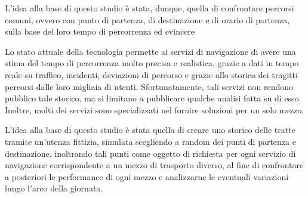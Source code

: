 L'idea alla base di questo studio è stata, dunque, quella di confrontare percorsi comuni, ovvero con punto di partenza, di destinazione e di orario di partenza, sulla base del loro tempo di percorrenza ed evincere 


















Lo stato attuale della tecnologia permette ai servizi di navigazione di avere una stima del tempo di percorrenza molto precisa e realistica, grazie a dati in tempo reale su traffico, incidenti, deviazioni di percorso e grazie allo storico dei tragitti percorsi dalle loro migliaia di utenti. Sfortunatamente, tali servizi non rendono pubblico tale storico, ma si limitano a pubblicare qualche analisi fatta su di esso. Inoltre, molti dei servizi sono specializzati nel fornire soluzioni per un solo mezzo.

\cite{croci2014}

\cite{rotaris2010}

\cite{rotaris2019}

\cite{meinardi2008}


L'idea alla base di questo studio è stata quella di creare uno storico delle tratte tramite un'utenza fittizia, simulata scegliendo a random dei punti di partenza e destinazione, inoltrando tali punti come oggetto di richiesta per ogni servizio di navigazione corrispondente a un mezzo di trasporto diverso, al fine di confrontare a posteriori le performance di ogni mezzo e analizzarne le eventuali variazioni lungo l'arco della giornata.
